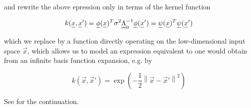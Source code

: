 and rewrite the above epression only in terms of the kernel function

\begin{equation}
    k(\vec{x}, \vec{x}') = \vec{\phi}(\vec{x})^T \sigma^2 \mat{\Lambda}_0^{-1} \vec{\phi}(\vec{x}') = \vec{\psi}(\vec{x})^T \vec{\psi}(\vec{x}')
\end{equation}

which we replace by a function directly operating on the low-dimensional
input space $\vec{x}$, which allows us to model an expression equivalent
to one would obtain from an infinite basis function expansion, e.g. by

\begin{equation}
    k(\vec{x}, \vec{x}') = \exp{\left( - \frac{1}{2}\left\|\vec{x} - \vec{x}'\right\|^2 \right)}
\end{equation}

See \cite{ras95} for the continuation.


\pagebreak